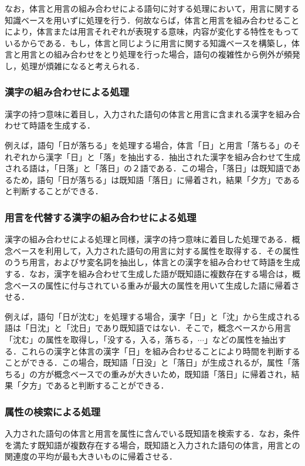 なお，体言と用言の組み合わせによる語句に対する処理において，用言に関する知識ベースを用いずに処理を行う．何故ならば，体言と用言を組み合わせることにより，体言または用言それぞれが表現する意味，内容が変化する特性をもっているからである．もし，体言と同じように用言に関する知識ベースを構築し，体言と用言との組み合わせをとり処理を行った場合，語句の複雑性から例外が頻発し，処理が煩雑になると考えられる．


\subsubsection{漢字の組み合わせによる処理}\label{kanji}
漢字の持つ意味に着目し，入力された語句の体言と用言に含まれる漢字を組み合わせて時語を生成する．

例えば，語句「日が落ちる」を処理する場合，体言「日」と用言「落ちる」のそれぞれから漢字「日」と「落」を抽出する．抽出された漢字を組み合わせて生成される語は，「日落」と「落日」の２語である．この場合，「落日」は既知語であるため，語句「日が落ちる」は既知語「落日」に帰着され，結果「夕方」であると判断することができる．

\subsubsection{用言を代替する漢字の組み合わせによる処理}
漢字の組み合わせによる処理と同様，漢字の持つ意味に着目した処理である．概念ベースを利用して，入力された語句の用言に対する属性を取得する．その属性のうち用言，およびサ変名詞を抽出し，体言との漢字を組み合わせて時語を生成する．なお，漢字を組み合わせて生成した語が既知語に複数存在する場合は，概念ベースの属性に付与されている重みが最大の属性を用いて生成した語に帰着させる．

例えば，語句「日が沈む」を処理する場合，漢字「日」と「沈」から生成される語は「日沈」と「沈日」であり既知語ではない．そこで，概念ベースから用言「沈む」の属性を取得し，「没する，入る，落ちる，$\cdots$」などの属性を抽出する．これらの漢字と体言の漢字「日」を組み合わせることにより時間を判断することができる．この場合，既知語「日没」と「落日」が生成されるが，属性「落ちる」の方が概念ベースでの重みが大きいため，既知語「落日」に帰着され，結果「夕方」であると判断することができる．

\subsubsection{属性の検索による処理}
入力された語句の体言と用言を属性に含んでいる既知語を検索する．なお，条件を満たす既知語が複数存在する場合，既知語と入力された語句の体言，用言との関連度の平均が最も大きいものに帰着させる．

